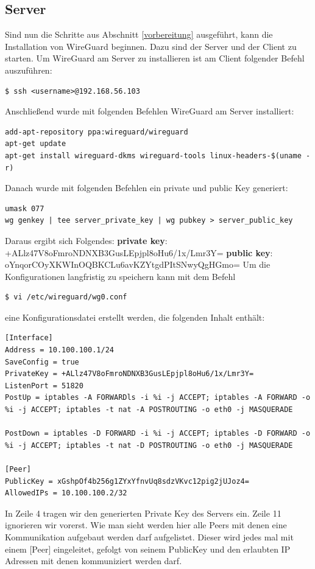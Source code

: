 \subsection{Server}
Sind nun die Schritte aus Abschnitt \ref{vorbereitung} ausgeführt, kann die Installation von WireGuard beginnen. Dazu sind der Server und der Client zu starten. Um WireGuard am Server zu installieren ist am Client folgender Befehl auszuführen:
\begin{lstlisting}
$ ssh <username>@192.168.56.103
\end{lstlisting}
Anschließend wurde mit folgenden Befehlen WireGuard am Server installiert:
\begin{lstlisting}
add-apt-repository ppa:wireguard/wireguard
apt-get update
apt-get install wireguard-dkms wireguard-tools linux-headers-$(uname -r)
\end{lstlisting}
Danach wurde mit folgenden Befehlen ein private und public Key generiert:
\begin{lstlisting}
umask 077
wg genkey | tee server_private_key | wg pubkey > server_public_key
\end{lstlisting}
Daraus ergibt sich Folgendes: \newline
\textbf{private key}: +ALlz47V8oFmroNDNXB3GusLEpjpl8oHu6/1x/Lmr3Y=\newline
\textbf{public key}: oYnqorCOyXKWInOQBKCLu6avKZYtgdPItSNwyQgHGmo=\newline
\newpage \noindent
Um die Konfigurationen langfristig zu speichern kann mit dem Befehl
\begin{lstlisting}
$ vi /etc/wireguard/wg0.conf
\end{lstlisting}
eine Konfigurationsdatei erstellt werden, die folgenden Inhalt enthält:
\begin{lstlisting}
[Interface]
Address = 10.100.100.1/24
SaveConfig = true
PrivateKey = +ALlz47V8oFmroNDNXB3GusLEpjpl8oHu6/1x/Lmr3Y=
ListenPort = 51820
PostUp = iptables -A FORWARDls -i %i -j ACCEPT; iptables -A FORWARD -o %i -j ACCEPT; iptables -t nat -A POSTROUTING -o eth0 -j MASQUERADE

PostDown = iptables -D FORWARD -i %i -j ACCEPT; iptables -D FORWARD -o %i -j ACCEPT; iptables -t nat -D POSTROUTING -o eth0 -j MASQUERADE

[Peer]
PublicKey = xGshpOf4b256g1ZYxYfnvUq8sdzVKvc12pig2jUJoz4=
AllowedIPs = 10.100.100.2/32
\end{lstlisting}
In Zeile 4 tragen wir den generierten Private Key des Servers ein. Zeile 11 ignorieren wir vorerst. Wie man sieht werden hier alle Peers mit denen eine Kommunikation aufgebaut werden darf aufgelistet. Dieser wird jedes mal mit einem [Peer] eingeleitet, gefolgt von seinem PublicKey und den erlaubten IP Adressen mit denen kommuniziert werden darf. \newline\newline
